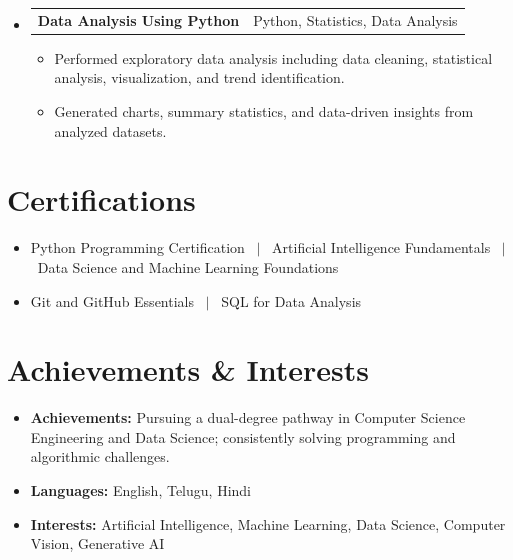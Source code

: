 \documentclass[a4paper,10pt]{article}
\makeatletter
\newcommand{\resumeProjectHeading}[2]{
  \vspace{-1pt}\item
    \begin{tabular*}{0.98\textwidth}[t]{l@{\extracolsep{\fill}}r}
      #1 & #2 \\
    \end{tabular*}\vspace{-6pt}
}
\newcommand{\resumeItemListStart}{\begin{itemize}[leftmargin=0.15in, labelsep=0.08in, itemsep=2pt, parsep=0pt]}
\newcommand{\resumeItemListEnd}{\end{itemize}\vspace{-4pt}}
\makeatother
\begin{document}
\begin{itemize}[leftmargin=0in, label={}]
    \resumeProjectHeading
      {\textbf{Data Analysis Using Python}}{Python, Statistics, Data Analysis}
      \resumeItemListStart
        \item Performed exploratory data analysis including data cleaning, statistical analysis, visualization, and trend identification.
        \item Generated charts, summary statistics, and data-driven insights from analyzed datasets.
      \resumeItemListEnd

  \end{itemize}

\section{Certifications}
  \begin{itemize}[leftmargin=0.15in, labelsep=0.08in, itemsep=1.5pt, parsep=0pt]
    \item Python Programming Certification \ $|$ \ Artificial Intelligence Fundamentals \ $|$ \ Data Science and Machine Learning Foundations
    \item Git and GitHub Essentials \ $|$ \ SQL for Data Analysis
  \end{itemize}

\section{Achievements \& Interests}
  \begin{itemize}[leftmargin=0.15in, labelsep=0.08in, itemsep=1.5pt, parsep=0pt]
    \item \textbf{Achievements:} Pursuing a dual-degree pathway in Computer Science Engineering and Data Science; consistently solving programming and algorithmic challenges.
    \item \textbf{Languages:} English, Telugu, Hindi
    \item \textbf{Interests:} Artificial Intelligence, Machine Learning, Data Science, Computer Vision, Generative AI
  \end{itemize}
\end{document}
